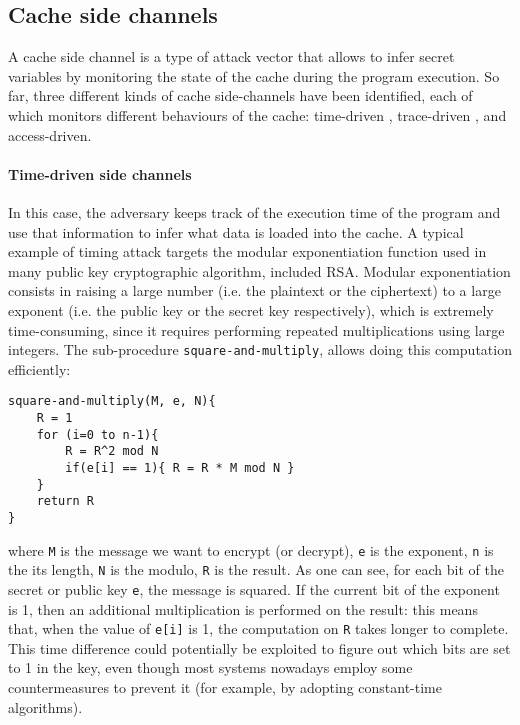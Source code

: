 \documentclass[target=mst,aauheader=aics]{thud}
\theoremstyle{definition}
\begin{document}
	\subsection{Cache side channels}\label{sec:cache-sc}
	A cache side channel \cite{Zhang2017} is a type of attack vector that allows to infer secret variables by monitoring the state of the cache during the program execution. So far, three different kinds of cache side-channels have been identified, each of which monitors different behaviours of the cache: time-driven \cite{Page2002}, trace-driven \cite{Page2002}, and access-driven.
	\paragraph{Time-driven side channels} In this case, the adversary keeps track of the execution time of the program and use that information to infer what data is loaded into the cache. 
	A typical example of timing attack targets the modular exponentiation function used in many public key cryptographic algorithm, included RSA. Modular exponentiation consists in raising a large number (i.e. the plaintext or the ciphertext) to a large exponent (i.e. the public key or the secret key respectively), which is extremely time-consuming, since it requires performing repeated multiplications using large integers. The sub-procedure \texttt{square-and-multiply}, allows doing this computation efficiently:
	
	\vspace{3mm}
	\begin{minipage}{.6\textwidth}
	\begin{lstlisting}
square-and-multiply(M, e, N){
	R = 1
	for (i=0 to n-1){
		R = R^2 mod N
		if(e[i] == 1){ R = R * M mod N }
	}	
	return R
}
	\end{lstlisting}
	\end{minipage}

	where \texttt{M} is the message we want to encrypt (or decrypt), \texttt{e} is the exponent, \texttt{n} is the its length, \texttt{N} is the modulo, \texttt{R} is the result. As one can see, for each bit of the secret or public key \texttt{e}, the message is squared. If the current bit of the exponent is 1, then an additional multiplication is performed on the result: this means that, when the value of \texttt{e[i]} is 1, the computation on \texttt{R} takes longer to complete. This time difference could potentially be exploited to figure out which bits are set to 1 in the key, even though most systems nowadays employ some countermeasures to prevent it (for example, by adopting constant-time algorithms).
\end{document}
